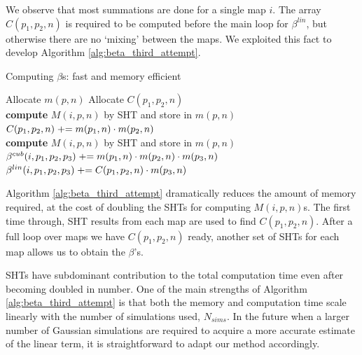 We observe that most summations are done for a single map $i$. The array $C(p_1,p_2,n)$ is required to be computed before the main loop for $\beta^{lin}$, but otherwise there are no `mixing' between the maps. We exploited this fact to develop Algorithm \ref{alg:beta_third_attempt}.

\begin{algorithm}[htbp]
	\caption{Computing $\beta$s: fast and memory efficient}
	\label{alg:beta_third_attempt}
	\begin{algorithmic}[1] %
		\State Allocate $m(p,n)$ 
		\State Allocate $C(p_1,p_2,n)$ 
		\\
				\State \textbf{compute} $M(i,p,n)$ by SHT and store in $m(p,n)$
			\EndFor
			\\
					\State $C(p_1,p_2,n) \mathrel{+}= m(p_1,n) \cdot m(p_2,n)$
				\EndFor
			\EndFor
		\EndFor
		\\
				\State \textbf{compute} $M(i,p,n)$ by SHT and store in $m(p,n)$
			\EndFor
			\\
					\label{alg:thrid_attempt_main_loop}	
					\State $\beta^{cub}(i, p_1, p_2, p_3) \mathrel{+}= m(p_1,n) \cdot m(p_2,n) \cdot m(p_3,n)$
					\State $\beta^{lin}(i, p_1, p_2, p_3) \mathrel{+}= C(p_1, p_2, n) \cdot m( p_3, n)$
				\EndFor
			\EndFor
		\EndFor
	\end{algorithmic}
\end{algorithm}

Algorithm \ref{alg:beta_third_attempt} dramatically reduces the amount of memory required, at the cost of doubling the SHTs for computing $M(i,p,n)$s. The first time through, SHT results from each map are used to find $C(p_1,p_2,n)$. After a full loop over maps we have $C(p_1,p_2,n)$ ready, another set of SHTs for each map allows us to obtain the $\beta$'s.

SHTs have subdominant contribution to the total computation time even after becoming doubled in number. One of the main strengths of Algorithm \ref{alg:beta_third_attempt} is that both the memory and computation time scale linearly with the number of simulations used, $N_{sims}$. In the future when a larger number of Gaussian simulations are required to acquire a more accurate estimate of the linear term, it is straightforward to adapt our method accordingly.

